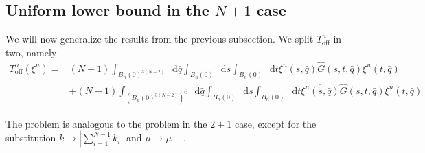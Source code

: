 \documentclass[a4paper,11pt]{article}
\newcommand{\abs}[1]{\left\lvert #1 \right\rvert}
\newcommand*\diff{\mathop{}\!\mathrm{d}}
\numberwithin{equation}{section}
\begin{document}
	\subsection{Uniform lower bound in the $ N+1 $ case}
	We will now generalize the results from the previous subsection. 
	We split $ T^n_{\text{off}} $ in two, namely 
	\begin{equation}
	\begin{aligned}
	T^n_{\text{off}}(\xi^n)=&(N-1)\int_{B_n(0)^{3(N-2)}}\diff \bar{q}\int_{B_n(0)}\diff s\int_{B_n(0)}\diff t \overline{\xi^n(s,\bar{q})}\hat{G}(s,t,\bar{q})\xi^n(t,\bar{q})\\
	&+(N-1)\int_{(B_n(0)^{3(N-2)})^\complement}\diff \bar{q}\int_{B_n(0)}\diff s\int_{B_n(0)}\diff t \overline{\xi^n(s,\bar{q})}\hat{G}(s,t,\bar{q})\xi^n(t,\bar{q})
	\end{aligned}
	\end{equation}
	
	The problem is analogous to the problem in the $ 2+1 $ case, except for the substitution $ k\to\abs{\sum_{i=1}^{N-1}k_i} $ and $ \mu\to\mu- $.
	
\end{document}
